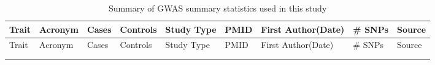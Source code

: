 
\begin{center}

\centering
\begin{longtable}{| L{5cm} | C{1.2cm} | C{1cm} | C{1.5cm} | C{1.5cm} | C{1.5cm} | L{2.5cm} | R{1.5cm} | L{4cm} |}
\caption{Summary of GWAS summary statistics used in this study}\label{tab:gwasm}\\
  \hline{}   Trait & Acronym & Cases & Controls & Study Type & PMID & First Author(Date) & \# SNPs  & Source \\ \hline \hline  
  \endfirsthead
  \hline  {} Trait & Acronym & Cases & Controls & Study Type & PMID & First Author(Date) & \# SNPs  & Source \\ \hline \hline 
  \endhead
  \hline {}  \\ \hline 
  \endfoot
  \hline \hline 
  \endlastfoot


\end{longtable}
\end{center}
